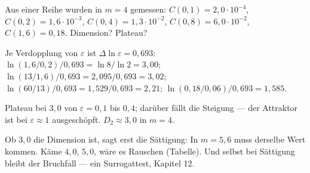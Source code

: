 \begin{aufgabe}
Aus einer Reihe wurden in $m = 4$ gemessen: $C(0{,}1) = 2{,}0\cdot10^{-4}$, $C(0{,}2) = 1{,}6\cdot10^{-3}$, $C(0{,}4) = 1{,}3\cdot10^{-2}$, $C(0{,}8) = 6{,}0\cdot10^{-2}$, $C(1{,}6) = 0{,}18$. Dimension? Plateau?

\loesung
{}
Je Verdopplung von $\varepsilon$ ist $\Delta\ln\varepsilon = 0{,}693$:
$\ln(1{,}6/0{,}2)/0{,}693 = \ln8/\ln2 = 3{,}00$; $\ln(13/1{,}6)/0{,}693 = 2{,}095/0{,}693 = 3{,}02$; $\ln(60/13)/0{,}693 = 1{,}529/0{,}693 = 2{,}21$; $\ln(0{,}18/0{,}06)/0{,}693 = 1{,}585$.

Plateau bei $3{,}0$ von $\varepsilon = 0{,}1$ bis $0{,}4$; darüber fällt die Steigung --- der Attraktor ist bei $\varepsilon \approx 1$ ausgeschöpft. $D_2 \approx 3{,}0$ in $m = 4$.

Ob $3{,}0$ die Dimension ist, sagt erst die Sättigung: In $m = 5, 6$ muss derselbe Wert kommen. Käme $4{,}0$, $5{,}0$, wäre es Rauschen (Tabelle). Und selbst bei Sättigung bleibt der Bruchfall --- ein Surrogattest, Kapitel 12.

\begin{center}
\begin{minipage}{0.88\textwidth}
\end{minipage}
\end{center}
\end{aufgabe}

